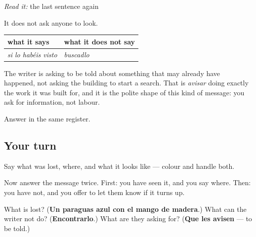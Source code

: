 \begin{grammarlens}[title={Grammar Lens: what the message is actually asking}]
\emph{Read it:} the last sentence again

It does not ask anyone to look.

\noindent
\begin{tabularx}{\linewidth}{@{}>{\raggedright\arraybackslash}X>{\raggedright\arraybackslash}X@{}}
\toprule
\textbf{what it says} & \textbf{what it does not say} \\
\midrule
\emph{si lo habéis visto} & \emph{buscadlo} \\
\bottomrule
\end{tabularx}

The writer is asking to be told about something that may already have happened, not asking the building to start a search. That is \emph{avisar} doing exactly the work it was built for, and it is the polite shape of this kind of message: you ask for information, not labour.

Answer in the same register.
\end{grammarlens}

\subsection*{Your turn}
Say what was lost, where, and what it looks like — colour and handle both.

Now answer the message twice. First: you have seen it, and you say where. Then: you have not, and you offer to let them know if it turns up.

\begin{tcolorbox}[breakable,colback=teal!4,colframe=teal!35!black,title={Before you move on}]
What is lost? (\textbf{Un paraguas azul con el mango de madera}.) What can the writer not do? (\textbf{Encontrarlo}.) What are they asking for? (\textbf{Que les avisen} — to be told.)
\end{tcolorbox}
